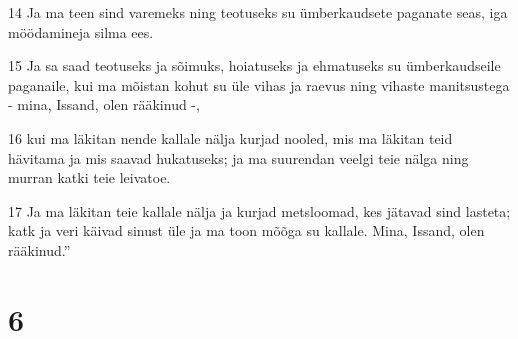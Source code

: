 \par 14 Ja ma teen sind varemeks ning teotuseks su ümberkaudsete paganate seas, iga möödamineja silma ees.
\par 15 Ja sa saad teotuseks ja sõimuks, hoiatuseks ja ehmatuseks su ümberkaudseile paganaile, kui ma mõistan kohut su üle vihas ja raevus ning vihaste manitsustega - mina, Issand, olen rääkinud -,
\par 16 kui ma läkitan nende kallale nälja kurjad nooled, mis ma läkitan teid hävitama ja mis saavad hukatuseks; ja ma suurendan veelgi teie nälga ning murran katki teie leivatoe.
\par 17 Ja ma läkitan teie kallale nälja ja kurjad metsloomad, kes jätavad sind lasteta; katk ja veri käivad sinust üle ja ma toon mõõga su kallale. Mina, Issand, olen rääkinud.”

\chapter{6}

